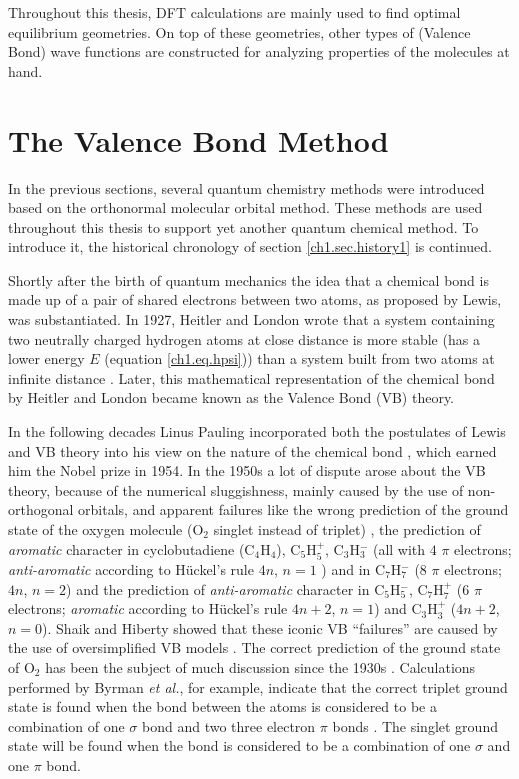 Throughout this thesis, DFT calculations are mainly used to find optimal equilibrium geometries. On top of these geometries, other types of (Valence Bond) wave functions are constructed for analyzing properties of the molecules at hand.

\section{The Valence Bond Method}

In the previous sections, several quantum chemistry methods were introduced based on the orthonormal molecular orbital method. These methods are used throughout this thesis to support yet another quantum chemical method. To introduce it, the historical chronology of section \ref{ch1.sec.history1} is continued.

Shortly after the birth of quantum mechanics the idea that a chemical bond is made up of a pair of shared electrons between two atoms, as proposed by Lewis, was substantiated. In 1927, Heitler and London wrote that a system containing two neutrally charged hydrogen atoms at close distance is more stable (has a lower energy $E$ (equation \ref{ch1.eq.hpsi})) than a system built from two atoms at infinite distance \cite{heitler}. Later, this mathematical representation of the chemical bond by Heitler and London became known as the Valence Bond (VB) theory. 

In the following decades Linus Pauling incorporated both the postulates of Lewis and VB theory into his view on the nature of the chemical bond \cite{pauling1,pauling2,pauling3,pauling4,pauling5,pauling6,pauling7,paulingbook}, which earned him the Nobel prize in 1954. In the 1950s a lot of dispute arose about the VB theory, because of the numerical sluggishness, mainly caused by the use of non-orthogonal orbitals, and apparent failures like the wrong prediction of the ground state of the oxygen molecule (O$_2$ singlet instead of triplet) \cite{carsten}, the prediction of \textit{aromatic} character in cyclobutadiene (C$_4$H$_4$), C$_5$H$_{5}^{+}$, C$_3$H$_{3}^{-}$ (all with $4$ $\pi$ electrons; \textit{anti-aromatic} according to H\"{u}ckel's rule $4n$, $n=1$ \cite{march}) and in C$_7$H$_{7}^{-}$ (8 $\pi$ electrons; $4n$, $n=2$) and the prediction of \textit{anti-aromatic} character in C$_5$H$_{5}^{-}$, C$_7$H$_{7}^{+}$ (6 $\pi$ electrons; \textit{aromatic} according to H\"{u}ckel's rule $4n+2$, $n=1$) and C$_3$H$_{3}^{+}$ ($4n+2$, $n=0$). Shaik and Hiberty showed that these iconic VB ``failures'' are caused by the use of oversimplified VB models \cite{antibrush}. The correct prediction of the ground state of O$_2$ has been the subject of much discussion since the 1930s \cite{o2_1,o2_2,o2_3,o2_4,o2_5,o2_6,o2_7,o2_8,o2_9,carsten}. Calculations performed by Byrman \textit{et al.}, for example, indicate that the correct triplet ground state is found when the bond between the atoms is considered to be a combination of one $\sigma$ bond and two three electron $\pi$ bonds \cite{carsten}. The singlet ground state will be found when the bond is considered to be a combination of one $\sigma$ and one $\pi$ bond.

